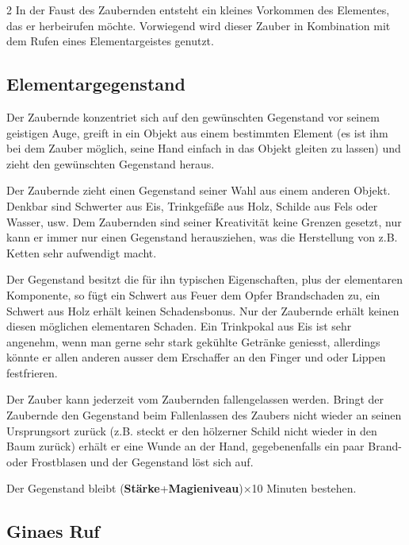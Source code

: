 \begin{multicols*}{2}
In der Faust des Zaubernden entsteht ein kleines Vorkommen des Elementes, das er herbeirufen möchte. Vorwiegend wird dieser Zauber in Kombination mit dem Rufen eines Elementargeistes genutzt.



\subsection{Elementargegenstand}

Der Zaubernde konzentriet sich auf den gewünschten Gegenstand vor seinem geistigen Auge, greift in ein Objekt aus einem bestimmten Element (es ist ihm bei dem Zauber möglich, seine Hand einfach in das Objekt gleiten zu lassen) und zieht den gewünschten Gegenstand heraus.

Der Zaubernde zieht einen Gegenstand seiner Wahl aus einem anderen Objekt. Denkbar sind Schwerter aus Eis, Trinkgefäße aus Holz, Schilde aus Fels oder Wasser, usw. Dem Zaubernden sind seiner Kreativität keine Grenzen gesetzt, nur kann er immer nur einen Gegenstand herausziehen, was die Herstellung von z.B. Ketten sehr aufwendigt macht.

Der Gegenstand besitzt die für ihn typischen Eigenschaften, plus der elementaren Komponente, so fügt ein Schwert aus Feuer dem Opfer Brandschaden zu, ein Schwert aus Holz erhält keinen Schadensbonus. Nur der Zaubernde erhält keinen diesen möglichen elementaren Schaden. Ein Trinkpokal aus Eis ist sehr angenehm, wenn man gerne sehr stark gekühlte Getränke geniesst, allerdings könnte er allen anderen ausser dem Erschaffer an den Finger und oder Lippen festfrieren.

Der Zauber kann jederzeit vom Zaubernden fallengelassen werden. Bringt der Zaubernde den Gegenstand beim Fallenlassen des Zaubers nicht wieder an seinen Ursprungsort zurück (z.B. steckt er den hölzerner Schild nicht wieder in den Baum zurück) erhält er eine Wunde an der Hand, gegebenenfalls ein paar Brand- oder Frostblasen und der Gegenstand löst sich auf.

Der Gegenstand bleibt (\textbf{Stärke}+\textbf{Magieniveau})×10 Minuten bestehen.



\subsection{Ginaes Ruf}


\end{multicols*}
